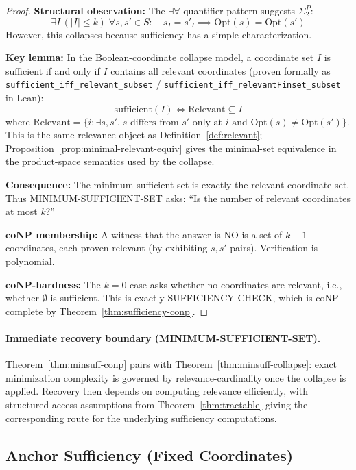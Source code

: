 \begin{proof}
\textbf{Structural observation:} The $\exists\forall$ quantifier pattern suggests $\Sigma_2^P$:
\[
\exists I \, (|I| \leq k) \; \forall s, s' \in S: \quad s_I = s'_I \implies \text{Opt}(s) = \text{Opt}(s')
\]
However, this collapses because sufficiency has a simple characterization.

\textbf{Key lemma:} In the Boolean-coordinate collapse model, a coordinate set $I$ is sufficient if and only if $I$ contains all relevant coordinates (proven formally as \texttt{sufficient\_iff\_relevant\_subset} / \texttt{sufficient\_iff\_relevantFinset\_subset} in Lean):
\[
\text{sufficient}(I) \iff \text{Relevant} \subseteq I
\]
where $\text{Relevant} = \{i : \exists s, s'.\; s \text{ differs from } s' \text{ only at } i \text{ and } \text{Opt}(s) \neq \text{Opt}(s')\}$.
This is the same relevance object as Definition~\ref{def:relevant}; Proposition~\ref{prop:minimal-relevant-equiv} gives the minimal-set equivalence in the product-space semantics used by the collapse.

\textbf{Consequence:} The minimum sufficient set is exactly the relevant-coordinate set. Thus MINIMUM-SUFFICIENT-SET asks: ``Is the number of relevant coordinates at most $k$?''

\textbf{coNP membership:} A witness that the answer is NO is a set of $k+1$ coordinates, each proven relevant (by exhibiting $s, s'$ pairs). Verification is polynomial.

\textbf{coNP-hardness:} The $k=0$ case asks whether no coordinates are relevant, i.e., whether $\emptyset$ is sufficient. This is exactly SUFFICIENCY-CHECK, which is coNP-complete by Theorem~\ref{thm:sufficiency-conp}.
\end{proof}

\paragraph{Immediate recovery boundary (MINIMUM-SUFFICIENT-SET).}
Theorem~\ref{thm:minsuff-conp} pairs with Theorem~\ref{thm:minsuff-collapse}: exact minimization complexity is governed by relevance-cardinality once the collapse is applied. Recovery then depends on computing relevance efficiently, with structured-access assumptions from Theorem~\ref{thm:tractable} giving the corresponding route for the underlying sufficiency computations.

\subsection{Anchor Sufficiency (Fixed Coordinates)}

